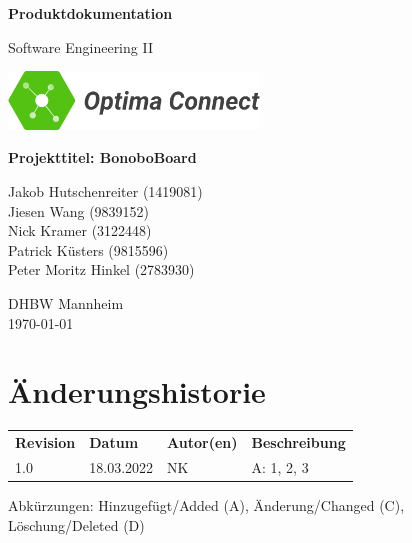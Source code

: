 \documentclass[a4paper,11pt]{scrartcl}
\begin{document}
\renewcommand*{\arraystretch}{1.2}
\begin{titlepage}
    \begin{center}
        \vspace*{1cm}\Huge
        \textbf{Produktdokumentation}\par                
        \vspace{0.5cm}\LARGE        
        Software Engineering II\par           
        \vspace{2cm}
        \includegraphics[width=0.5\textwidth]{OptimaLogo_long}\par   
        \vspace{1cm}
        \textbf{Projekttitel: BonoboBoard}\par        
        \vfill\Large   
        Jakob Hutschenreiter (1419081)\\Jiesen Wang (9839152)\\Nick Kramer (3122448)\\Patrick Küsters (9815596)\\Peter Moritz Hinkel (2783930)\par
        \vspace{2cm}
        DHBW Mannheim\\
        \today     
    \end{center}
\end{titlepage}

\section*{Änderungshistorie}
\begin{table}[h]
	\begin{tabular}{@{} p{20mm} p{25mm} p{25mm} p{75mm}}
		\textbf{Revision} & \textbf{Datum} & \textbf{Autor(en)} & \textbf{Beschreibung}\\
		1.0 & 18.03.2022 & NK & A: 1, 2, 3\\
	\end{tabular}
\end{table}
\noindent
Abkürzungen: Hinzugefügt/Added (A), Änderung/Changed (C), Löschung/Deleted (D)
\vspace{2cm}
\tableofcontents
\newpage
{}
\end{document}
